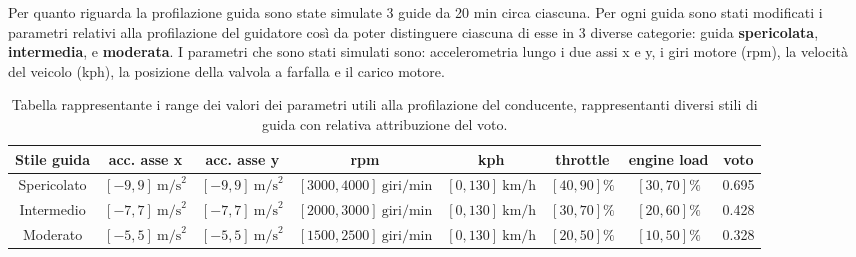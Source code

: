 \documentclass[12pt, a4paper, italian]{report}
\numberwithin{figure}{chapter}
\numberwithin{table}{chapter}
\begin{document}
Per quanto riguarda la profilazione guida sono state simulate 3 guide da 20 min circa ciascuna. Per ogni guida sono stati modificati i parametri relativi alla profilazione del guidatore così da poter distinguere ciascuna di esse in 3 diverse categorie: guida \textbf{spericolata}, \textbf{intermedia},  e \textbf{moderata}. I parametri che sono stati simulati sono: accelerometria lungo i due assi x e y, i giri motore (rpm), la velocità del veicolo (kph), la posizione della valvola a farfalla e il carico motore. 

\begin{table}[h!]
  \centering 
  \begin{adjustbox}{max width=\textwidth}
    \begin{tabular}{|c|c|c|c|c|c|c|c|}
      \hline
      \textbf{Stile guida} & \textbf{acc. asse x} & \textbf{acc. asse y} & \textbf{rpm} & \textbf{kph} & \textbf{throttle} & \textbf{engine load} & \textbf{voto} \\
      \hline
      Spericolato & $[-9,9] \ \text{m/s}^2$ & $[-9,9] \ \text{m/s}^2$ & $[3000,4000] \ \text{giri/min}$ & $[0,130] \ \text{km/h}$ & $[40,90] \%$ & $[30,70] \%$  & 0.695\\
      \hline
      Intermedio & $[-7,7] \ \text{m/s}^2$ & $[-7,7] \ \text{m/s}^2$ & $[2000,3000] \ \text{giri/min}$ & $[0,130] \ \text{km/h}$ & $[30,70] \%$ & $[20,60] \%$  & 0.428\\
      \hline
      Moderato & $[-5,5] \ \text{m/s}^2$ & $[-5,5] \ \text{m/s}^2$ & $[1500,2500] \ \text{giri/min}$ & $[0,130] \ \text{km/h}$ & $[20,50] \%$ & $[10,50] \%$  & 0.328\\
      \hline
    \end{tabular}
  \end{adjustbox}
  \caption{Tabella rappresentante i range dei valori dei parametri utili alla profilazione del conducente, rappresentanti diversi stili di guida con relativa attribuzione del voto.}
  \label{tab:stili_di_guida}
\end{table}
\end{document}
